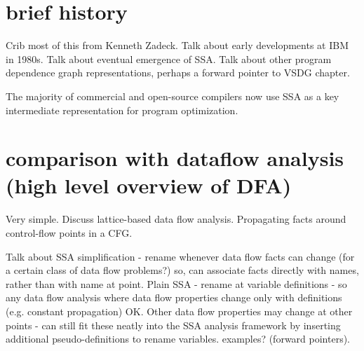 
\section{brief history}


Crib most of this from Kenneth Zadeck. 
Talk about early developments at IBM in 1980s.
Talk about eventual emergence of SSA.
Talk about other program dependence graph
representations, perhaps a forward pointer to 
VSDG chapter.

The majority of commercial and open-source compilers
now use SSA as a key intermediate representation for
program optimization.


\section{comparison with dataflow analysis (high level overview of DFA)}


Very simple. Discuss lattice-based data flow analysis.
Propagating facts around control-flow points in a CFG.

Talk about SSA simplification - rename whenever data flow
facts can change (for a certain class of data flow problems?)
so, can associate facts directly with names, rather than with
name at point.
Plain SSA - rename at variable definitions - so any data flow
analysis where data flow properties change only with definitions
(e.g. constant propagation) OK. Other data flow properties may 
change at other points - can still fit these neatly into the SSA
analysis framework by inserting additional pseudo-definitions
to rename variables. examples? (forward pointers).


